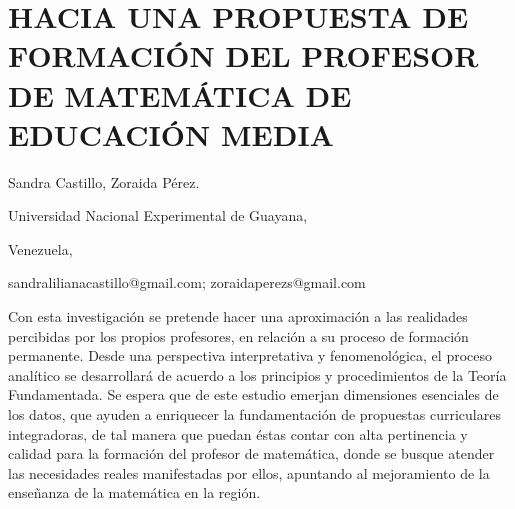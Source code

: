 \setcounter{section}{352}


\section{HACIA UNA PROPUESTA DE FORMACIÓN DEL PROFESOR DE MATEMÁTICA DE EDUCACIÓN
MEDIA }

\begin{datos}

Sandra Castillo, Zoraida Pérez.

Universidad Nacional Experimental de Guayana,

Venezuela,

sandralilianacastillo@gmail.com; zoraidaperezs@gmail.com

\end{datos}

Con esta investigación se pretende hacer una aproximación a las realidades
percibidas por los propios profesores, en relación a su proceso de
formación permanente. Desde una perspectiva interpretativa y fenomenológica,
el proceso analítico se desarrollará de acuerdo a los principios y
procedimientos de la Teoría Fundamentada. Se espera que de este estudio
emerjan dimensiones esenciales de los datos, que ayuden a enriquecer
la fundamentación de propuestas curriculares integradoras, de tal
manera que puedan éstas contar con alta pertinencia y calidad para
la formación del profesor de matemática, donde se busque atender las
necesidades reales manifestadas por ellos, apuntando al mejoramiento
de la enseñanza de la matemática en la región. 

